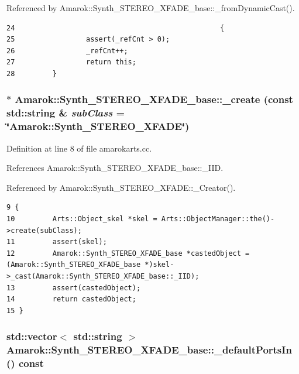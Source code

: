 Referenced by Amarok::Synth\_\-STEREO\_\-XFADE\_\-base::\_\-from\-Dynamic\-Cast().



\footnotesize\begin{verbatim}24                                                 {
25                 assert(_refCnt > 0);
26                 _refCnt++;
27                 return this;
28         }
\end{verbatim}\normalsize 
{}
\subsubsection{ $\ast$ Amarok::Synth\_\-STEREO\_\-XFADE\_\-base::\_\-create (const std::string \& {\em sub\-Class} = \char`\"{}Amarok::Synth\_\-STEREO\_\-XFADE\char`\"{})\hspace{0.3cm}{\tt  [static, inherited]}}\label{classAmarok_1_1Synth__STEREO__XFADE__base_Amarok_1_1Synth__STEREO__XFADE__stube0}




Definition at line 8 of file amarokarts.cc.

References Amarok::Synth\_\-STEREO\_\-XFADE\_\-base::\_\-IID.

Referenced by Amarok::Synth\_\-STEREO\_\-XFADE::\_\-Creator().



\footnotesize\begin{verbatim}9 {
10         Arts::Object_skel *skel = Arts::ObjectManager::the()->create(subClass);
11         assert(skel);
12         Amarok::Synth_STEREO_XFADE_base *castedObject = (Amarok::Synth_STEREO_XFADE_base *)skel->_cast(Amarok::Synth_STEREO_XFADE_base::_IID);
13         assert(castedObject);
14         return castedObject;
15 }
\end{verbatim}\normalsize 
{}
\subsubsection{\setlength{\rightskip}{0pt plus 5cm}std::vector$<$ std::string $>$ Amarok::Synth\_\-STEREO\_\-XFADE\_\-base::\_\-default\-Ports\-In () const\hspace{0.3cm}{\tt  [virtual, inherited]}}\label{classAmarok_1_1Synth__STEREO__XFADE__base_Amarok_1_1Synth__STEREO__XFADE__stuba4}




